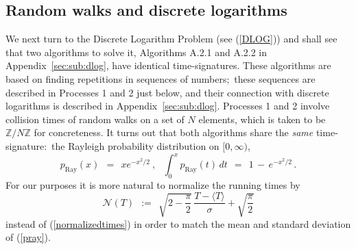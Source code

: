 \documentclass{llncs}
\numberwithin{equation}{section}
\newcommand{\Z}{{\mathbb{Z}}}
\renewcommand\({\left(}
\renewcommand\){\right)}
\begin{document}

\subsection*{Random walks and discrete logarithms}

    We next turn to the Discrete Logarithm Problem (see (\ref{DLOG})) and shall see that two algorithms to solve it,  Algorithms A.2.1 and A.2.2 in Appendix~\ref{sec:sub:dlog}, have   identical time-signatures.
    These algorithms are based on finding repetitions in sequences of numbers;~these sequences are described in Processes 1 and 2 just below, and their connection with discrete logarithms is described in
    Appendix~\ref{sec:sub:dlog}.
      Processes 1 and 2 involve collision times of random walks on a set of $N$ elements, which is taken to be $\Z/N\Z$ for concreteness.
      It turns out that both algorithms share the {\it same}  time-signature:~the Rayleigh   probability distribution on $[0,\infty)$,
\begin{equation}\label{pray}
  p_{\text{Ray}}(x) \ \ = \ \ xe^{-x^2/2}\ , \ \ \ \int_{0}^x p_{\text{Ray}}(t)\,dt \ \ = \ \ 1\,-\,e^{-x^2/2}\,.
\end{equation}
    For our purposes it is more natural to normalize the running times by
     \begin{equation}\label{normalizedtimesRay}
   {\mathcal N}(T) \ \ := \ \ \sqrt{2-\frac{\pi}{2}}\,\frac{T -\langle T\rangle}{\sigma}+\sqrt{\frac{\pi}{2}}
 \end{equation}
     instead of (\ref{normalizedtimes}) in order to match the mean and standard deviation of (\ref{pray}).
  \\
\end{document}
